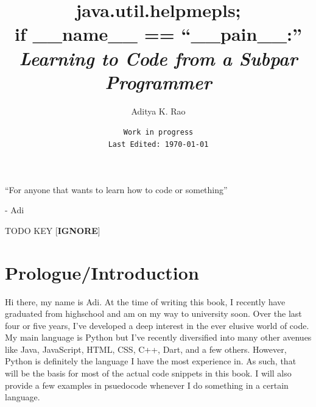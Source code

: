 \documentclass[12pt,a4paper]{book}
\newenvironment{dedication}
{%
	\thispagestyle{empty}%
	\vspace*{\stretch{1}}%
	\itshape             %
	\raggedleft          %
}
{\par %
	\vspace{\stretch{3}} %
	\clearpage           %
}
\begin{document}
	\title{java.util.helpmepls; \\
	if \_\_name\_\_ == ``\_\_pain\_\_:'' \\
	\large{\textit{Learning to Code from a Subpar Programmer}}}
	\author{Aditya K. Rao}
	\date{\texttt{Work in progress \\ Last Edited: \today}}
	\maketitle

	\begin{dedication}
		``For anyone that wants to learn how to code or something''
		\par   %
		
		\vspace{\baselineskip}
		- Adi
	\end{dedication}
	
	\tableofcontents
	\listoftodos
	TODO KEY [\textbf{IGNORE}]

	
	\chapter*{Prologue/Introduction}  \label{chap:intro}
		Hi there, my name is Adi. At the time of writing this book, I recently have graduated from highschool and am on my way to university soon. Over the last four or five years, I've developed a deep interest in the ever elusive world of code. My main language is Python but I've recently diversified into many other avenues like Java, JavaScript, HTML, CSS, C++, Dart, and a few others. However, Python is definitely the language I have the most experience in. As such, that will be the basis for most of the actual code snippets in this book. I will also provide a few examples in psuedocode whenever I do something in a certain language. 
		
\end{document}
